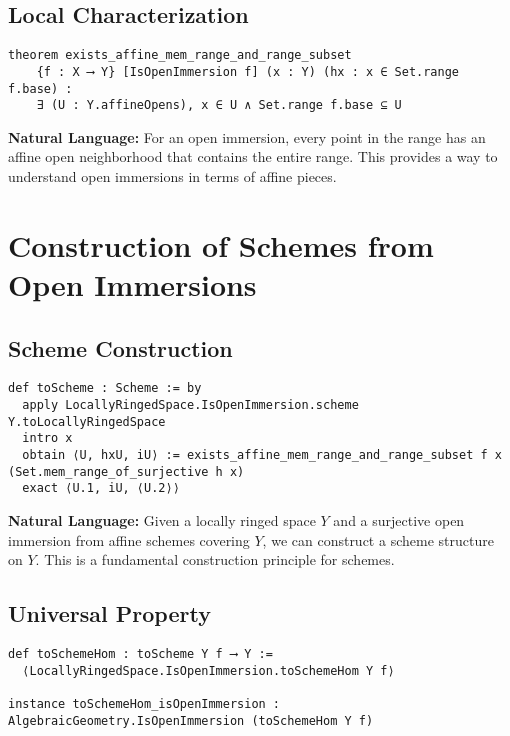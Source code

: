 \documentclass{article}
\theoremstyle{definition}
\begin{document}
\subsection{Local Characterization}

\begin{lstlisting}
theorem exists_affine_mem_range_and_range_subset
    {f : X ⟶ Y} [IsOpenImmersion f] (x : Y) (hx : x ∈ Set.range f.base) :
    ∃ (U : Y.affineOpens), x ∈ U ∧ Set.range f.base ⊆ U
\end{lstlisting}

\textbf{Natural Language:} For an open immersion, every point in the range has an affine open neighborhood that contains the entire range. This provides a way to understand open immersions in terms of affine pieces.

\section{Construction of Schemes from Open Immersions}

\subsection{Scheme Construction}

\begin{lstlisting}
def toScheme : Scheme := by
  apply LocallyRingedSpace.IsOpenImmersion.scheme Y.toLocallyRingedSpace
  intro x
  obtain ⟨U, hxU, iU⟩ := exists_affine_mem_range_and_range_subset f x (Set.mem_range_of_surjective h x)
  exact ⟨U.1, iU, ⟨U.2⟩⟩
\end{lstlisting}

\textbf{Natural Language:} Given a locally ringed space $Y$ and a surjective open immersion from affine schemes covering $Y$, we can construct a scheme structure on $Y$. This is a fundamental construction principle for schemes.

\subsection{Universal Property}

\begin{lstlisting}
def toSchemeHom : toScheme Y f ⟶ Y :=
  ⟨LocallyRingedSpace.IsOpenImmersion.toSchemeHom Y f⟩

instance toSchemeHom_isOpenImmersion : AlgebraicGeometry.IsOpenImmersion (toSchemeHom Y f)
\end{lstlisting}
\end{document}
